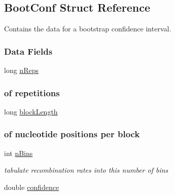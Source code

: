 \hypertarget{struct_boot_conf}{\subsection{Boot\-Conf Struct Reference}
\label{struct_boot_conf}
}


Contains the data for a bootstrap confidence interval.  


\subsubsection*{Data Fields}
\begin{DoxyCompactItemize}
\item 
\hypertarget{struct_boot_conf_ad7d61e383dfef5ae24ec8dea59feda3d}{long \hyperlink{struct_boot_conf_ad7d61e383dfef5ae24ec8dea59feda3d}{n\-Reps}}\label{struct_boot_conf_ad7d61e383dfef5ae24ec8dea59feda3d}

\begin{DoxyCompactList}\small\item\em \subsubsection*{of repetitions}\end{DoxyCompactList}\item 
\hypertarget{struct_boot_conf_abd095b45e3b74b9da1abad14d9abf501}{long \hyperlink{struct_boot_conf_abd095b45e3b74b9da1abad14d9abf501}{block\-Length}}\label{struct_boot_conf_abd095b45e3b74b9da1abad14d9abf501}

\begin{DoxyCompactList}\small\item\em \subsubsection*{of nucleotide positions per block}\end{DoxyCompactList}\item 
\hypertarget{struct_boot_conf_a3d42d32697c1d9f7371b4fdc75c7ab7a}{int \hyperlink{struct_boot_conf_a3d42d32697c1d9f7371b4fdc75c7ab7a}{n\-Bins}}\label{struct_boot_conf_a3d42d32697c1d9f7371b4fdc75c7ab7a}

\begin{DoxyCompactList}\small\item\em tabulate recombination rates into this number of bins \end{DoxyCompactList}\item 
\hypertarget{struct_boot_conf_a755fb4fbfa8e079445e1c6a8298446f9}{double \hyperlink{struct_boot_conf_a755fb4fbfa8e079445e1c6a8298446f9}{confidence}}\label{struct_boot_conf_a755fb4fbfa8e079445e1c6a8298446f9}


\end{DoxyCompactItemize}
